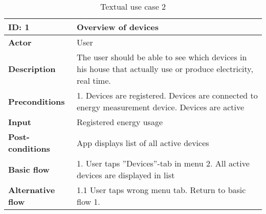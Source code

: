 \begin{table}[H]
\begin{tabular}{|l|p{11.7cm}|}
\hline
\textbf{ID:} 1&\textbf{Overview of devices}\\\hline
\textbf{Actor} &User\\\hline
\textbf{Description}&
The user should be able to see which devices in his house that actually use or produce electricity, real time.\\\hline
\textbf{Preconditions}&
1. Devices are registered\newline
2. Devices are connected to energy measurement device\newline
3. Devices are active\\\hline
\textbf{Input}&
Registered energy usage\\\hline
\textbf{Post-conditions}& App displays list of all active devices\\\hline
\textbf{Basic flow}&
1. User taps ''Devices''-tab in menu
2. All active devices are displayed in list\\\hline
\textbf{Alternative flow}&
1.1 User taps wrong menu tab. Return to basic flow 1.\\\hline
\end{tabular}
\caption{Textual use case 2}
\end{table}





